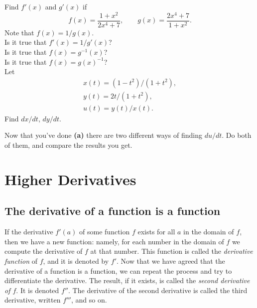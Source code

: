 \begin{multicols}{2}
\problem   
\subprob Find $f'(x)$ and $g'(x)$ if
\[
f(x)=\frac{1+x^2}{2x^4+7}, \qquad g(x)=\frac{2x^4+7}{1+x^2}.
\]
Note that $f(x)=1/g(x)$.\\
\subprob Is it true that $f'(x)=1/g'(x)$?\\
\subprob Is it true that $f(x) = g^{-1}(x)$?\\
\subprob Is it true that $f(x)= g(x)^{-1}$?\\








\problem \subprob Let 
\begin{gather*}
  x(t)=(1-t^2)/(1+t^2),\\
  y(t)=2t/(1+t^2),\\
  u(t)=y(t)/x(t).
\end{gather*}
Find $dx/dt$, $dy/dt$.




\subprob Now that you've done \textbf{(a)} there are two
different ways of finding $du/dt$.  Do
both of them, and compare the results you get.




\end{multicols}
\normalsize\rmfamily








\noproblemfont
\section{Higher Derivatives} 




\subsection{The derivative of a function is a function} 
If the derivative $f'(a)$ of some function $f$ exists for all $a$ in the domain
of $f$, then we have a new function: namely, for each number in the domain of
$f$ we compute the derivative of $f$ at that number.  This function is called
the \emph{derivative function} of $f$, and it is denoted by $f'$.  Now that we
have agreed that the derivative of a function is a function, we can repeat the
process and try to differentiate the derivative.  The result, if it exists, is
called the \emph{second derivative of $f$}.  It is denoted $f''$.  The
derivative of the second derivative is called the third derivative, written
$f'''$, and so on.





